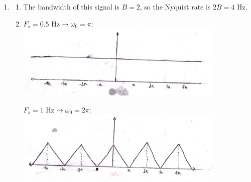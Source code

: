 \documentclass[12pt]{article}
\begin{document}
\begin{enumerate}
      \item \begin{enumerate}
                  \item The bandwidth of this signal is $B=2$, so the Nyquist rate is $2B=\boxed{4\text{ Hz}}$.
                  \item $F_s=0.5\text{ Hz} \rightarrow \omega_0=\pi$: \\
                        \includegraphics[width=10cm]{img/hw7/half_hertz}

                        $F_s=1\text{ Hz} \rightarrow \omega_0=2\pi$: \\
                        \includegraphics[width=10cm]{img/hw7/one_hertz}


\end{enumerate}
\end{enumerate}
\end{document}
